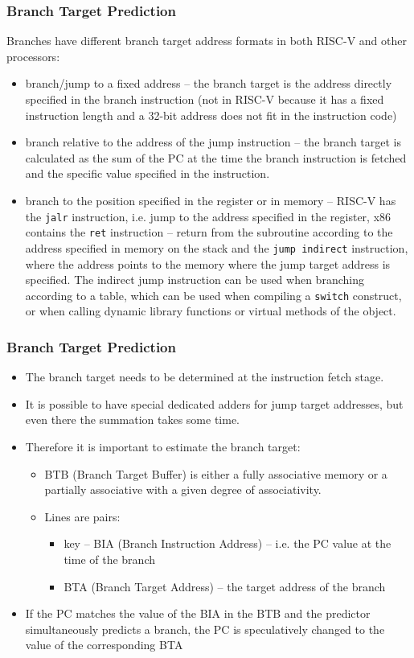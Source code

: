 \documentclass{beamer}
\begin{document}
\begin{frame}[shrink=1]
\frametitle{Branch Target Prediction}

Branches have different branch target address formats in both RISC-V and other processors:
\begin{itemize}
\item branch/jump to a fixed address -- the branch target is the address directly specified in the branch instruction (not in RISC-V because it has a fixed instruction length and a 32-bit address does not fit in the instruction code)
\item branch relative to the address of the jump instruction -- the branch target is calculated as the sum of the PC at the time the branch instruction is fetched and the specific value specified in the instruction.
\item branch to the position specified in the register or in memory -- RISC-V has the \texttt{jalr} instruction, i.e. jump to the address specified in the register, x86 contains the \texttt{ret} instruction -- return from the subroutine according to the address specified in memory on the stack and the \texttt{jump indirect} instruction, where the address points to the memory where the jump target address is specified. The indirect jump instruction can be used when branching according to a table, which can be used when compiling a \texttt{switch} construct, or when calling dynamic library functions or virtual methods of the object.
\end{itemize}
\end{frame}

\begin{frame}
\frametitle{Branch Target Prediction}

\begin{itemize}
\item The branch target needs to be determined at the instruction fetch stage.
\item It is possible to have special dedicated adders for jump target addresses, but even there the summation takes some time.
\item Therefore it is important to estimate the branch target:
\begin{itemize}
\item BTB (Branch Target Buffer) is either a fully associative memory or a partially
associative with a given degree of associativity.
\item Lines are pairs:
\begin{itemize}
\item key -- BIA (Branch Instruction Address) -- i.e. the PC value at the time of the branch
\item BTA (Branch Target Address) -- the target address of the branch
\end{itemize}
\end{itemize}
\item If the PC matches the value of the BIA in the BTB and the predictor simultaneously predicts a branch, the PC is speculatively changed to the value of the corresponding BTA
\end{itemize}
\end{frame}
\end{document}

